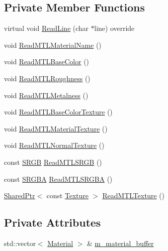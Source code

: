 \subsection*{Private Member Functions}
\begin{DoxyCompactItemize}
\item 
virtual void \hyperlink{classmage_1_1loader_1_1_m_t_l_reader_af16f5fa26bd9649d56550738bae77d24}{Read\+Line} (char $\ast$line) override
\item 
void \hyperlink{classmage_1_1loader_1_1_m_t_l_reader_adb3f407d3c72ea25e3a6dc917b880bbc}{Read\+M\+T\+L\+Material\+Name} ()
\item 
void \hyperlink{classmage_1_1loader_1_1_m_t_l_reader_a1baab97ace07be143d8cc26fac576bf6}{Read\+M\+T\+L\+Base\+Color} ()
\item 
void \hyperlink{classmage_1_1loader_1_1_m_t_l_reader_afdedbcb7b77cf9baf2881b877808ccc0}{Read\+M\+T\+L\+Roughness} ()
\item 
void \hyperlink{classmage_1_1loader_1_1_m_t_l_reader_a4f4da1e887d1f14f3fcde951df9a4d4d}{Read\+M\+T\+L\+Metalness} ()
\item 
void \hyperlink{classmage_1_1loader_1_1_m_t_l_reader_ae6e311806f880ee98ff42f7631b79b4a}{Read\+M\+T\+L\+Base\+Color\+Texture} ()
\item 
void \hyperlink{classmage_1_1loader_1_1_m_t_l_reader_ad22db8ca91554c2eafda3734ad866b24}{Read\+M\+T\+L\+Material\+Texture} ()
\item 
void \hyperlink{classmage_1_1loader_1_1_m_t_l_reader_a29eef6fe7f430117637b03b8ab12a39e}{Read\+M\+T\+L\+Normal\+Texture} ()
\item 
const \hyperlink{structmage_1_1_s_r_g_b}{S\+R\+GB} \hyperlink{classmage_1_1loader_1_1_m_t_l_reader_aaf1ee000e25870c5391cb47e09c896b4}{Read\+M\+T\+L\+S\+R\+GB} ()
\item 
const \hyperlink{structmage_1_1_s_r_g_b_a}{S\+R\+G\+BA} \hyperlink{classmage_1_1loader_1_1_m_t_l_reader_aebc0aa1ff4679968716e166d2bc1cc23}{Read\+M\+T\+L\+S\+R\+G\+BA} ()
\item 
\hyperlink{namespacemage_a1e01ae66713838a7a67d30e44c67703e}{Shared\+Ptr}$<$ const \hyperlink{classmage_1_1_texture}{Texture} $>$ \hyperlink{classmage_1_1loader_1_1_m_t_l_reader_a84404b76b7378dd3fa3fa101ee6265a9}{Read\+M\+T\+L\+Texture} ()
\end{DoxyCompactItemize}
\subsection*{Private Attributes}
\begin{DoxyCompactItemize}
\item 
std\+::vector$<$ \hyperlink{classmage_1_1_material}{Material} $>$ \& \hyperlink{classmage_1_1loader_1_1_m_t_l_reader_aefd5c533c3abb3cf5315084e853249ff}{m\+\_\+material\+\_\+buffer}
\end{DoxyCompactItemize}


